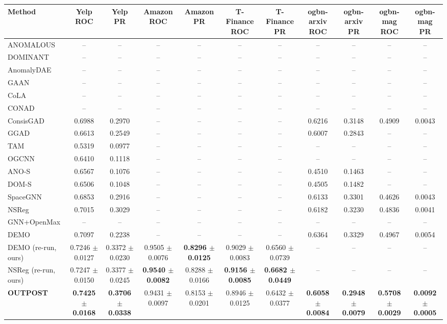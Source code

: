 \begin{table}[t]
\centering
\small
\begin{tabular}{lcccccccccc}
\toprule
Method & Yelp ROC & Yelp PR & Amazon ROC & Amazon PR & T-Finance ROC & T-Finance PR & ogbn-arxiv ROC & ogbn-arxiv PR & ogbn-mag ROC & ogbn-mag PR \\
\midrule
ANOMALOUS & -- & -- & -- & -- & -- & -- & -- & -- & -- & -- \\
DOMINANT & -- & -- & -- & -- & -- & -- & -- & -- & -- & -- \\
AnomalyDAE & -- & -- & -- & -- & -- & -- & -- & -- & -- & -- \\
GAAN & -- & -- & -- & -- & -- & -- & -- & -- & -- & -- \\
CoLA & -- & -- & -- & -- & -- & -- & -- & -- & -- & -- \\
CONAD & -- & -- & -- & -- & -- & -- & -- & -- & -- & -- \\
ConsisGAD & 0.6988 & 0.2970 & -- & -- & -- & -- & 0.6216 & 0.3148 & 0.4909 & 0.0043 \\
GGAD & 0.6613 & 0.2549 & -- & -- & -- & -- & 0.6007 & 0.2843 & -- & -- \\
TAM & 0.5319 & 0.0977 & -- & -- & -- & -- & -- & -- & -- & -- \\
OGCNN & 0.6410 & 0.1118 & -- & -- & -- & -- & -- & -- & -- & -- \\
ANO-S & 0.6567 & 0.1076 & -- & -- & -- & -- & 0.4510 & 0.1463 & -- & -- \\
DOM-S & 0.6506 & 0.1048 & -- & -- & -- & -- & 0.4505 & 0.1482 & -- & -- \\
SpaceGNN & 0.6853 & 0.2916 & -- & -- & -- & -- & 0.6133 & 0.3301 & 0.4626 & 0.0043 \\
NSReg & 0.7015 & 0.3029 & -- & -- & -- & -- & 0.6182 & 0.3230 & 0.4836 & 0.0041 \\
GNN+OpenMax & -- & -- & -- & -- & -- & -- & -- & -- & -- & -- \\
DEMO & 0.7097 & 0.2238 & -- & -- & -- & -- & 0.6364 & 0.3329 & 0.4967 & 0.0054 \\
DEMO (re-run, ours) & 0.7246 $\pm$ 0.0127 & 0.3372 $\pm$ 0.0230 & 0.9505 $\pm$ 0.0076 & \textbf{0.8296 $\pm$ 0.0125} & 0.9029 $\pm$ 0.0083 & 0.6560 $\pm$ 0.0739 & -- & -- & -- & -- \\
NSReg (re-run, ours) & 0.7247 $\pm$ 0.0150 & 0.3377 $\pm$ 0.0245 & \textbf{0.9540 $\pm$ 0.0082} & 0.8288 $\pm$ 0.0166 & \textbf{0.9156 $\pm$ 0.0085} & \textbf{0.6682 $\pm$ 0.0449} & -- & -- & -- & -- \\
\midrule
\textbf{OUTPOST} & \textbf{0.7425 $\pm$ 0.0168} & \textbf{0.3706 $\pm$ 0.0338} & 0.9431 $\pm$ 0.0097 & 0.8153 $\pm$ 0.0201 & 0.8946 $\pm$ 0.0125 & 0.6432 $\pm$ 0.0377 & \textbf{0.6058 $\pm$ 0.0084} & \textbf{0.2948 $\pm$ 0.0079} & \textbf{0.5708 $\pm$ 0.0029} & \textbf{0.0092 $\pm$ 0.0005} \\

\end{tabular}
\end{table}
